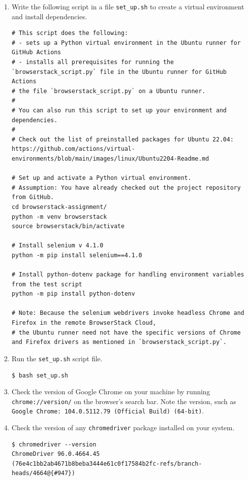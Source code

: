 \documentclass{article}
\begin{document}
\begin{enumerate}
    \item Write the following script in a file \texttt{set\_up.sh} to create a virtual environment and install dependencies.

\begin{lstlisting}[style=bash]
# This script does the following:
# - sets up a Python virtual environment in the Ubuntu runner for GitHub Actions
# - installs all prerequisites for running the `browserstack_script.py` file in the Ubuntu runner for GitHub Actions 
# the file `browserstack_script.py` on a Ubuntu runner.  
#
# You can also run this script to set up your environment and dependencies.
#
# Check out the list of preinstalled packages for Ubuntu 22.04: https://github.com/actions/virtual-environments/blob/main/images/linux/Ubuntu2204-Readme.md

# Set up and activate a Python virtual environment.
# Assumption: You have already checked out the project repository from GitHub.
cd browserstack-assignment/
python -m venv browserstack
source browserstack/bin/activate

# Install selenium v 4.1.0
python -m pip install selenium==4.1.0

# Install python-dotenv package for handling environment variables from the test script
python -m pip install python-dotenv

# Note: Because the selenium webdrivers invoke headless Chrome and Firefox in the remote BrowserStack Cloud, 
# the Ubuntu runner need not have the specific versions of Chrome and Firefox drivers as mentioned in `browserstack_script.py`.
\end{lstlisting}

    \item Run the \texttt{set\_up.sh} script file.

\begin{lstlisting}[style=bash]
$ bash set_up.sh
\end{lstlisting}

    \item Check the version of Google Chrome on your machine by running \texttt{chrome://version/} on the browser's search bar. Note the version, such as \texttt{Google Chrome: 104.0.5112.79 (Official Build) (64-bit)}.

    \item Check the version of any \texttt{chromedriver} package installed on your system.

\begin{lstlisting}[style=bash]
$ chromedriver --version
ChromeDriver 96.0.4664.45 (76e4c1bb2ab4671b8beba3444e61c0f17584b2fc-refs/branch-heads/4664@{#947})
\end{lstlisting}


\end{enumerate}
\end{document}
